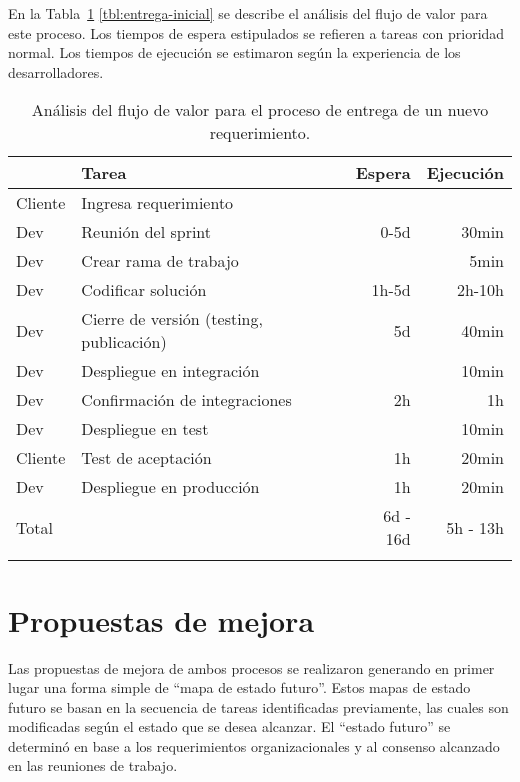 %
En la \iflatexml{}Tabla~\ref{tbl:entrega-inicial}\else%
\autoref{tbl:entrega-inicial}\fi{} se describe el análisis del flujo
de valor para este proceso. Los tiempos de espera estipulados se
refieren a tareas con prioridad normal. Los tiempos de ejecución se
estimaron según la experiencia de los desarrolladores.
%
%
\begin{table}[h]
  \tableStyle
  \smaller
  \iflatexml%
  \begin{tabular}{llrr}
  \else%
  \sisetup{
      table-format = 2.1(2),
      table-number-alignment = right,
      separate-uncertainty=true,
  }
  \begin{tabular}{llrr}
  \fi%
  \toprule 
  Actor & Tarea & Espera & Ejecución \\
  \midrule
  Cliente & Ingresa requerimiento & & \\
  Dev & Reunión del sprint & 0-5d & 30min \\
  Dev & Crear rama de trabajo & & 5min \\
  Dev & Codificar solución & 1h-5d & 2h-10h \\
  Dev & Cierre de versión (testing, publicación) & 5d & 40min \\
  Dev & Despliegue en integración & & 10min \\
  Dev & Confirmación de integraciones & 2h & 1h \\
  Dev & Despliegue en test & & 10min \\
  Cliente & Test de aceptación & 1h & 20min \\
  Dev & Despliegue en producción & 1h & 20min \\
  \addlinespace\midrule
  Total & & 6d - 16d & 5h - 13h \\
  \bottomrule
  \\
  \end{tabular}
  \caption{
    Análisis del flujo de valor para el proceso de entrega de un nuevo
    requerimiento.
  }
  \label{tbl:entrega-inicial}
\end{table}
%
%
\section{Propuestas de mejora}
%
Las propuestas de mejora de ambos procesos se realizaron generando en
primer lugar una forma simple de ``mapa de estado futuro''. Estos mapas
de estado futuro se basan en la secuencia de tareas identificadas
previamente, las cuales son modificadas según el estado que se desea
alcanzar. El ``estado futuro'' se determinó en base a los requerimientos
organizacionales y al consenso alcanzado en las reuniones de trabajo.

